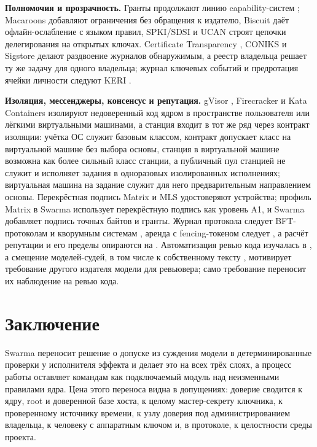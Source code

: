 \documentclass[10pt,a4paper]{article}
\begin{document}
\textbf{Полномочия и прозрачность.} Гранты продолжают линию capability-систем \cite{dennis1966,miller2006}; Macaroons \cite{macaroons} добавляют ограничения без обращения к издателю, Biscuit \cite{biscuit} даёт офлайн-ослабление с языком правил, SPKI/SDSI \cite{spki} и UCAN \cite{ucan} строят цепочки делегирования на открытых ключах. Certificate Transparency \cite{ct,ct2}, CONIKS \cite{coniks} и Sigstore \cite{sigstore} делают раздвоение журналов обнаружимым, а реестр владельца решает ту же задачу для одного владельца; журнал ключевых событий и предротация ячейки личности следуют KERI \cite{keri}.

\textbf{Изоляция, мессенджеры, консенсус и репутация.} gVisor \cite{gvisor}, Firecracker \cite{firecracker} и Kata Containers \cite{kata} изолируют недоверенный код ядром в пространстве пользователя или лёгкими виртуальными машинами, а станция входит в тот же ряд через контракт изоляции: учётка ОС служит базовым классом, контракт допускает класс на виртуальной машине без выбора основы, станция в виртуальной машине возможна как более сильный класс станции, а публичный пул станцией не служит и исполняет задания в одноразовых изолированных исполнениях; виртуальная машина на задание служит для него предварительным направлением основы. Перекрёстная подпись Matrix \cite{matrix} и MLS \cite{mls} удостоверяют устройства; профиль Matrix в Swarma использует перекрёстную подпись как уровень A1, и Swarma добавляет подпись точных байтов и гранты. Журнал протокола следует BFT-протоколам и кворумным системам \cite{pbft,hotstuff,byzquorum}, аренда с fencing-токеном следует \cite{chubby,kleppmann-fencing}, а расчёт репутации и его пределы опираются на \cite{eigentrust,sybil,sybilproof}. Автоматизация ревью кода изучалась в \cite{tufano2021,tufano2022,codereviewer,frommgen2024}, а смещение моделей-судей, в том числе к собственному тексту \cite{llmjudge,selfpref}, мотивирует требование другого издателя модели для ревьювера; само требование переносит их наблюдение на ревью кода.

\section{Заключение}

Swarma переносит решение о допуске из суждения модели в детерминированные проверки у исполнителя эффекта и делает это на всех трёх слоях, а процесс работы оставляет командам как подключаемый модуль над неизменными правилами ядра. Цена этого переноса видна в допущениях: доверие сводится к ядру, root и доверенной базе хоста, к целому мастер-секрету ключника, к проверенному источнику времени, к узлу доверия под администрированием владельца, к человеку с аппаратным ключом и, в протоколе, к целостности среды проекта.
\end{document}
